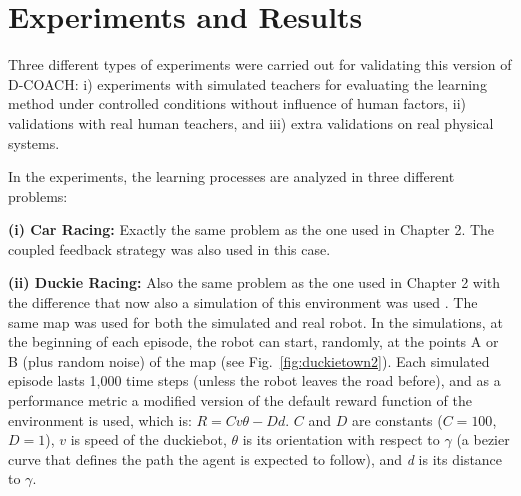 \section{Experiments and Results}

Three different types of experiments were carried out for validating this version of D-COACH: i) experiments with simulated teachers for evaluating the learning method under controlled conditions without influence of human factors, ii) validations with real human teachers, and iii) extra validations on real physical systems.


In the experiments, the learning processes are analyzed in three different problems:

\textbf{(i) Car Racing:} Exactly the same problem as the one used in Chapter 2. The coupled feedback strategy was also used in this case. 
    
\textbf{(ii) Duckie Racing:} Also the same problem as the one used in Chapter 2 with the difference that now also a simulation of this environment was used \cite{gym_duckietown}. The same map was used for both the simulated and real robot. In the simulations, at the beginning of each episode, the robot can start, randomly, at the points A or B (plus random noise) of the map (see Fig.~\ref{fig:duckietown2}). Each simulated episode lasts 1,000 time steps (unless the robot leaves the road before), and as a performance metric a modified version of the default reward function of the environment is used, which is: $R = Cv\theta - Dd$. $C$ and $D$ are constants ($C=100$, $D=1$), $v$ is speed of the duckiebot, $\theta$ is its orientation with respect to $\gamma$ (a bezier curve that defines the path the agent is expected to follow), and \emph{d} is its distance to $\gamma$.

